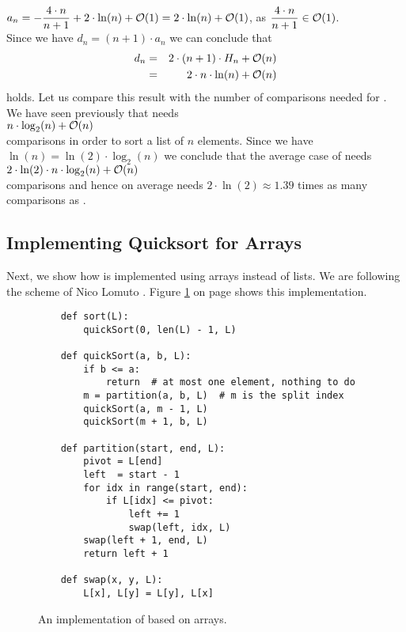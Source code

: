 $\displaystyle a_n = - \frac{4 \cdot n}{n+1}  + 2 \cdot \ln(n) + \mathcal{O}(1) =  2 \cdot \ln(n) + \mathcal{O}(1)$,
\quad as \quad $\displaystyle \frac{4 \cdot n}{n+1} \in \mathcal{O}(1)$.
\\[0.2cm]
Since we have $d_n = (n+1) \cdot a_{n}$ we can conclude that
\begin{eqnarray*}  
 d_n & = &  2 \cdot(n+1) \cdot H_n + \mathcal{O}(n) \\
     & = & 2 \cdot n \cdot \ln(n) + \mathcal{O}(n)
\end{eqnarray*}
holds.  Let us compare this result with the number of comparisons needed for .
We have seen previously that  needs
\\[0.2cm]
\hspace*{1.3cm} $n \cdot \log_2(n) + \mathcal{O}(n)$ \\[0.2cm]
comparisons in order to sort a list of $n$ elements.  Since we have $\ln(n) = \ln(2) \cdot \log_2(n)$
we conclude that the average case of  needs
 \\[0.2cm]
\hspace*{1.3cm} $2 \cdot \ln(2) \cdot n \cdot \log_2(n) + \mathcal{O}(n)$ \\[0.2cm]
comparisons and hence on average  needs  $2 \cdot \ln(2) \approx 1.39$ times as many comparisons as
.  


\subsection{Implementing Quicksort for Arrays}
Next, we show how   is implemented using arrays instead of lists.  We are following the scheme
of Nico Lomuto \cite{cormen:09}.
Figure \ref{fig:quick-sort-array.stlx} on page \pageref{fig:quick-sort-array.stlx} shows this implementation. 

\begin{figure}[!ht]
  \centering
\begin{verbatim}
    def sort(L):
        quickSort(0, len(L) - 1, L)
    
    def quickSort(a, b, L):
        if b <= a:
            return  # at most one element, nothing to do
        m = partition(a, b, L)  # m is the split index
        quickSort(a, m - 1, L)
        quickSort(m + 1, b, L)
    
    def partition(start, end, L):
        pivot = L[end]
        left  = start - 1
        for idx in range(start, end):
            if L[idx] <= pivot:
                left += 1
                swap(left, idx, L)
        swap(left + 1, end, L)
        return left + 1
    
    def swap(x, y, L):
        L[x], L[y] = L[y], L[x]    
\end{verbatim}
\vspace*{-0.3cm}
  \caption{An implementation of  based on arrays.}
  \label{fig:quick-sort-array.stlx}
\end{figure}

